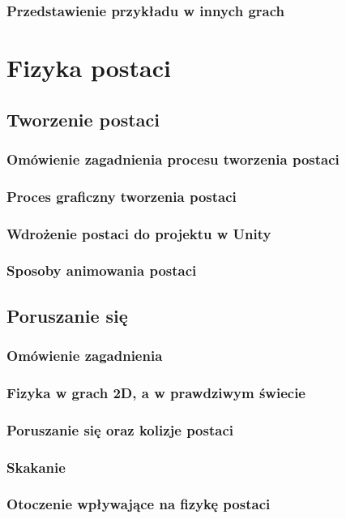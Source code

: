 \documentclass[oneside,polski,logo]{amuthesis}
\begin{document}
\subsection{Przedstawienie przykładu w innych grach}

\chapter{Fizyka postaci}
\section{Tworzenie postaci}
\subsection{Omówienie zagadnienia procesu tworzenia postaci}
\subsection{Proces graficzny tworzenia postaci}
\subsection{Wdrożenie postaci do projektu w Unity}
\subsection{Sposoby animowania postaci}

\section{Poruszanie się}
\subsection{Omówienie zagadnienia}
\subsection{Fizyka w grach 2D, a w prawdziwym świecie}
\subsection{Poruszanie się oraz kolizje postaci}
\subsection{Skakanie} 
\subsection{Otoczenie wpływające na fizykę postaci}
\end{document}

